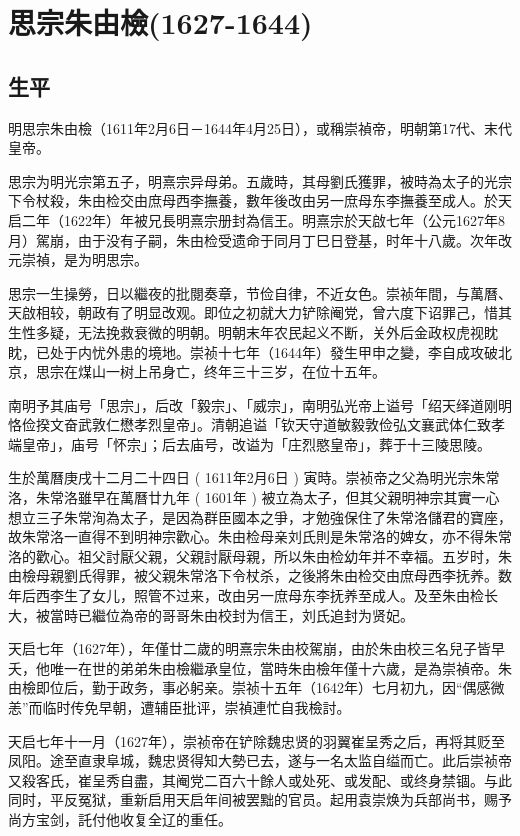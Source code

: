 
\section{思宗朱由檢\tiny(1627-1644)}

\subsection{生平}

明思宗朱由檢（1611年2月6日－1644年4月25日），或稱崇禎帝，明朝第17代、末代皇帝。

思宗为明光宗第五子，明熹宗异母弟。五歲時，其母劉氏獲罪，被時為太子的光宗下令杖殺，朱由检交由庶母西李撫養，數年後改由另一庶母东李撫養至成人。於天启二年（1622年）年被兄長明熹宗册封為信王。明熹宗於天啟七年（公元1627年8月）駕崩，由于没有子嗣，朱由检受遗命于同月丁巳日登基，时年十八歲。次年改元崇禎，是为明思宗。

思宗一生操勞，日以繼夜的批閱奏章，节俭自律，不近女色。崇祯年間，与萬曆、天啟相较，朝政有了明显改观。即位之初就大力铲除阉党，曾六度下诏罪己，惜其生性多疑，无法挽救衰微的明朝。明朝末年农民起义不断，关外后金政权虎视眈眈，已处于内忧外患的境地。崇祯十七年（1644年）發生甲申之變，李自成攻破北京，思宗在煤山一树上吊身亡，终年三十三岁，在位十五年。

南明予其庙号「思宗」，后改「毅宗」、「威宗」，南明弘光帝上谥号「绍天绎道刚明恪俭揆文奋武敦仁懋孝烈皇帝」。清朝追谥「钦天守道敏毅敦俭弘文襄武体仁致孝端皇帝」，庙号「怀宗」；后去庙号，改谥为「庄烈愍皇帝」，葬于十三陵思陵。

生於萬曆庚戌十二月二十四日 ( 1611年2月6日 ) 寅時。崇祯帝之父為明光宗朱常洛，朱常洛雖早在萬曆廿九年 ( 1601年 ) 被立為太子，但其父親明神宗其實一心想立三子朱常洵為太子，是因為群臣國本之爭，才勉強保住了朱常洛儲君的寶座，故朱常洛一直得不到明神宗歡心。朱由检母亲刘氏則是朱常洛的婢女，亦不得朱常洛的歡心。祖父討厭父親，父親討厭母親，所以朱由检幼年并不幸福。五岁时，朱由檢母親劉氏得罪，被父親朱常洛下令杖杀，之後將朱由检交由庶母西李抚养。数年后西李生了女儿，照管不过来，改由另一庶母东李抚养至成人。及至朱由检长大，被當時已繼位為帝的哥哥朱由校封为信王，刘氏追封为贤妃。

天启七年（1627年），年僅廿二歲的明熹宗朱由校駕崩，由於朱由校三名兒子皆早夭，他唯一在世的弟弟朱由檢繼承皇位，當時朱由檢年僅十六歲，是為崇禎帝。朱由檢即位后，勤于政务，事必躬亲。崇祯十五年（1642年）七月初九，因“偶感微恙”而临时传免早朝，遭辅臣批评，崇禎連忙自我檢討。

天启七年十一月（1627年），崇祯帝在铲除魏忠贤的羽翼崔呈秀之后，再将其贬至凤阳。途至直隶阜城，魏忠贤得知大勢已去，遂与一名太监自缢而亡。此后崇祯帝又殺客氏，崔呈秀自盡，其阉党二百六十餘人或处死、或发配、或终身禁锢。与此同时，平反冤狱，重新启用天启年间被罢黜的官员。起用袁崇焕为兵部尚书，赐予尚方宝剑，託付他收复全辽的重任。

